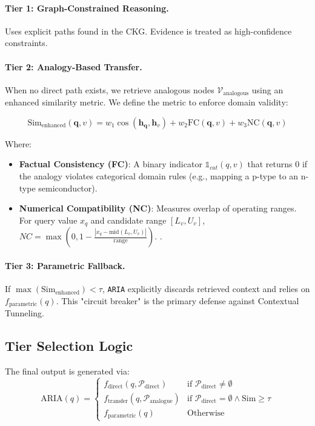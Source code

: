 \paragraph{Tier 1: Graph-Constrained Reasoning.}
Uses explicit paths found in the CKG. Evidence is treated as high-confidence constraints.

\paragraph{Tier 2: Analogy-Based Transfer.}
When no direct path exists, we retrieve analogous nodes $\mathcal{V}_{\text{analogous}}$ using an enhanced similarity metric. We define the metric to enforce domain validity:

\begin{equation}
 \text{Sim}_{\text{enhanced}}(\mathbf{q},v) = w_1 \cos(\mathbf{h_q}, \mathbf{h}_v) + w_2 \text{FC}(\mathbf{q}, v) + w_3 \text{NC}(\mathbf{q}, v) 
\end{equation}

Where:
\begin{itemize}
    \item \textbf{Factual Consistency (FC)}: A binary indicator $\mathbb{1}_{cat}(q, v)$ that returns 0 if the analogy violates categorical domain rules (e.g., mapping a p-type to an n-type semiconductor).
    \item \textbf{Numerical Compatibility (NC)}: Measures overlap of operating ranges. For query value $x_q$ and candidate range $[L_v, U_v]$, $NC = \max(0, 1 - \frac{|x_q - \text{mid}(L_v, U_v)|}{\text{range}})$. .
\end{itemize}

\paragraph{Tier 3: Parametric Fallback.}
If $\max(\text{Sim}_{\text{enhanced}}) < \tau$, \texttt{ARIA} explicitly discards retrieved context and relies on $f_\text{parametric}(q)$. This "circuit breaker" is the primary defense against Contextual Tunneling.

\subsection{Tier Selection Logic}
The final output is generated via:
\begin{equation}
 \text{ARIA}(q) = \begin{cases} 
 f_\text{direct}(q,\mathcal{P}_{\text{direct}}) & \text{if } \mathcal{P}_{\text{direct}} \neq \emptyset \\
 f_\text{transfer}(q,\mathcal{P}_{\text{analogue}} ) & \text{if } \mathcal{P}_{\text{direct}}=\emptyset \land \text{Sim} \geq \tau  \\
f_\text{parametric}(q) & \text{Otherwise}
\end{cases}
\end{equation}

